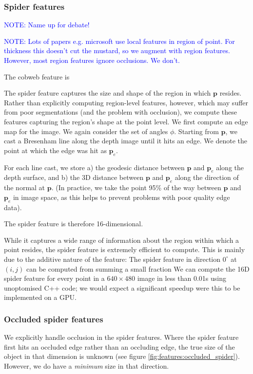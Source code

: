 \documentclass[10pt,twocolumn,letterpaper]{article}
\makeatletter
\renewcommand*{\eg}{e.g.\@\xspace}
\newcommand{\degree}{^{\circ}}
\newcommand{\point}{\mathbf{p}}
\newcommand{\note}[1]{\textcolor{blue}{NOTE: #1}}
\makeatother
\begin{document}
\subsubsection{Spider features }
\note{Name up for debate!}

\note{Lots of papers \eg microsoft use local features in region of point. For thickness this doesn't cut the mustard, so we augment with region features. However, most region features ignore occlusions. We don't.}

The cobweb feature is 

The spider feature captures the size and shape of the region in which $\point$ resides. 
Rather than explicitly computing region-level features, however, which may suffer from poor segmentations (and the problem with occlusion), we compute these features capturing the region's shape at the point level. 
We first compute an edge map for the image.
We again consider the set of angles $\phi$. Starting from $\point$, we cast a Bresenham line along the depth image until it hits an edge. 
We denote the point at which the edge was hit as $\point_{e}$.

For each line cast, we store
a) the geodesic distance between $\point$ and $\point_{e}$ along the depth surface, and 
b) the 3D distance between $\point$ and $\point_{e}$ along the direction of the normal at $\point$. (In practice, we take the point 95\% of the way between $\point$ and $\point_{e}$ in image space, as this helps to prevent problems with poor quality edge data).

The spider feature is therefore 16-dimensional.

While it captures a wide range of information about the region within which a point resides, the spider feature is extremely efficient to compute.
This is mainly due to the additive nature of the feature: The spider feature in direction $0\degree$ at $(i, j)$ can be computed from summing a small fraction 
We can compute the 16D spider feature for every point in a $640\times480$ image in less than 0.01s using unoptomised C++ code; we would expect a significant speedup were this to be implemented on a GPU.

\subsubsection{Occluded spider features}

We explicitly handle occlusion in the spider features. Where the spider feature first hits an occluded edge rather than an occluding edge, the true size of the object in that dimension is unknown (see figure \ref{fig:features:occluded_spider}).
However, we do have a \textit{minimum} size in that direction.
\end{document}
